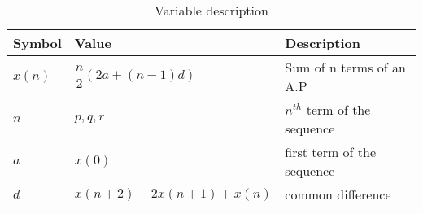 \begin{table}[h]
    \centering
    \begin{tabular}{|p{2.5cm}|p{2.5cm}|p{2.5cm}|}
    \hline
   Symbol&Value&Description\\ \hline
   $x(n)$&{$\dfrac{n}{2}(2a+(n-1)d)$}&Sum of n terms of an A.P\\ \hline
   $n$&$p,q,r$&$n^{th}$ term of the sequence\\ \hline
   $a$&$x(0)$&first term of the sequence\\ \hline
   $d$&\tiny$x(n+2)-2x(n+1)+x(n)$&common difference\\ \hline

    \end{tabular}
    \caption{Variable description}
    \label{tab:11.9.2.11}
\end{table}

